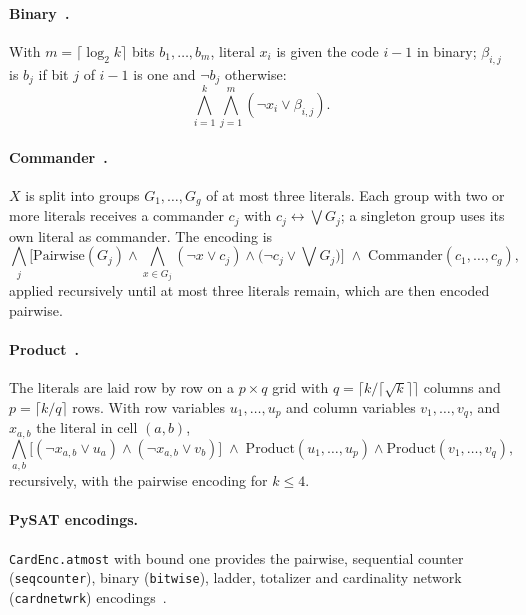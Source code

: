 \documentclass[a4paper,fleqn]{cas-sc}
\begin{document}
\paragraph{Binary~\citep{frisch2005solving}.} With $m=\lceil\log_2 k\rceil$ bits $b_1,\dots,b_m$, literal $x_i$ is given the code $i-1$ in binary; $\beta_{i,j}$ is $b_j$ if bit $j$ of $i-1$ is one and $\neg b_j$ otherwise:
\begin{equation}
\bigwedge_{i=1}^{k}\bigwedge_{j=1}^{m}(\neg x_i\vee \beta_{i,j}).
\end{equation}

\paragraph{Commander~\citep{klieber2007efficient}.} $X$ is split into groups $G_1,\dots,G_g$ of at most three literals. Each group with two or more literals receives a commander $c_j$ with $c_j\leftrightarrow\bigvee G_j$; a singleton group uses its own literal as commander. The encoding is
\begin{equation}
\bigwedge_{j}\Big[\mathrm{Pairwise}(G_j)\wedge\bigwedge_{x\in G_j}(\neg x\vee c_j)\wedge\big(\neg c_j\vee\textstyle\bigvee G_j\big)\Big]\;\wedge\;\mathrm{Commander}(c_1,\dots,c_g),
\end{equation}
applied recursively until at most three literals remain, which are then encoded pairwise.

\paragraph{Product~\citep{chen2010new}.} The literals are laid row by row on a $p\times q$ grid with $q=\lceil k/\lceil\sqrt{k}\rceil\rceil$ columns and $p=\lceil k/q\rceil$ rows. With row variables $u_1,\dots,u_p$ and column variables $v_1,\dots,v_q$, and $x_{a,b}$ the literal in cell $(a,b)$,
\begin{equation}
\bigwedge_{a,b}\big[(\neg x_{a,b}\vee u_a)\wedge(\neg x_{a,b}\vee v_b)\big]\;\wedge\;\mathrm{Product}(u_1,\dots,u_p)\wedge\mathrm{Product}(v_1,\dots,v_q),
\end{equation}
recursively, with the pairwise encoding for $k\le4$.

\paragraph{PySAT encodings.} \texttt{CardEnc.atmost} with bound one provides the pairwise, sequential counter (\texttt{seqcounter}), binary (\texttt{bitwise}), ladder, totalizer and cardinality network (\texttt{cardnetwrk}) encodings~\citep{ignatiev2018pysat}.
\end{document}
